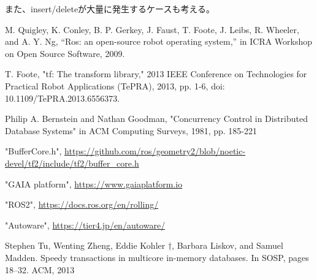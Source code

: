 \documentclass{jarticle}
\begin{document}
\begin{multicols}{2}
また、insert/deleteが大量に発生するケースも考える。

	
\begin{thebibliography}{99}

 M. Quigley, K. Conley, B. P. Gerkey, J. Faust, T. Foote, J. Leibs, R. Wheeler, and A. Y. Ng, “Ros: an open-source robot operating system,” in ICRA Workshop on Open Source Software, 2009.

 T. Foote, "tf: The transform library," 2013 IEEE Conference on Technologies for Practical Robot Applications (TePRA), 2013, pp. 1-6, doi: 10.1109/TePRA.2013.6556373.

 Philip A. Bernstein and Nathan Goodman, "Concurrency Control in Distributed Database Systems" in ACM Computing Surveys, 1981, pp. 185-221

 "BufferCore.h", \url{https://github.com/ros/geometry2/blob/noetic-devel/tf2/include/tf2/buffer_core.h}

 "GAIA platform", \url{https://www.gaiaplatform.io}

 "ROS2", \url{https://docs.ros.org/en/rolling/}

 "Autoware", \url{https://tier4.jp/en/autoware/}

 Stephen Tu, Wenting Zheng, Eddie Kohler †, Barbara Liskov,
and Samuel Madden. Speedy transactions in multicore in-memory
databases. In SOSP, pages 18–32. ACM, 2013

\end{thebibliography}
	
\end{multicols}	
\end{document}
